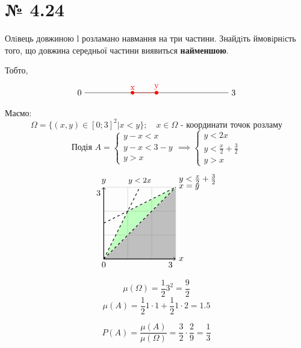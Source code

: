 \section*{№ 4.24}
\begin{mdframed}
	Олiвець довжиною l розламано навмання на три частини. 
	Знайдiть ймовiрнiсть того, що довжина середньої частини 
	виявиться \textbf{найменшою}.
\end{mdframed}

Тобто,
$$
\begin{tikzpicture}
	\draw (0,0) node[left]{0} -- (6,0) node[right]{3};
	\draw[red] (1*2,0) -- (1.5*2,0);
	\filldraw[red] (1*2,0) circle (2pt) node[above] {x};
	\filldraw[red] (1.5*2,0) circle (2pt) node[above] {y};
\end{tikzpicture}
$$

Маємо:
$$ \Omega = \{(x,y) \in [0;3]^2 | x < y\};\quad x \in \Omega \text{ - координати точок розламу}$$
$$ \text{Подія } A = 
\left\{\begin{array}{c}
	y-x < x \\
	y-x < 3-y \\
	y > x
\end{array}\right. \implies
\left\{\begin{array}{c}
	y < 2x \\
	y < \frac{x}{2} + \frac{3}{2} \\
	y > x
\end{array}\right.$$
$$
\begin{tikzpicture}
	\filldraw[fill=black!25, draw=black!0] (0,0) -- (3,3) -- (3,0) -- cycle;
	\filldraw[fill=green!25, draw=black!0] (0,0) -- (1,2) -- (3,3) -- cycle;
	\draw[step=1cm,gray,very thin] (0,0) grid (3,3);
	\draw[thick,->] (0,0) node[anchor=north] {$0$} -- (3,0) node[anchor=west] {$x$} node[anchor=north east] {$3$};
	\draw[thick,->] (0,0) -- (0,3) node[anchor=south] {$y$} node[anchor=north east] {$3$};
	\draw[thick, dashed] (0,0) -- (3,3) node[right] {$x = y$};
	\draw[thick, dashed] (0,0) -- (1.5,3) node[above] {\small $y < 2x$}; 
	\draw[thick, dashed] (0,1.5) -- (3,3) node[above right] {$y < \frac{x}{2} + \frac{3}{2}$}; 
\end{tikzpicture}
$$

$$\mu(\Omega) = \frac{1}{2} 3^2 = \frac{9}{2}$$
$$\mu(A) = \frac{1}{2} 1\cdot 1 + \frac{1}{2} 1 \cdot 2 = 1.5$$


\begin{mdframed}[style=ans]
	$$ P(A) = \frac{\mu(A)}{\mu(\Omega)} = \frac{3}{2} \cdot \frac{2}{9} = \frac{1}{3} $$
\end{mdframed}


